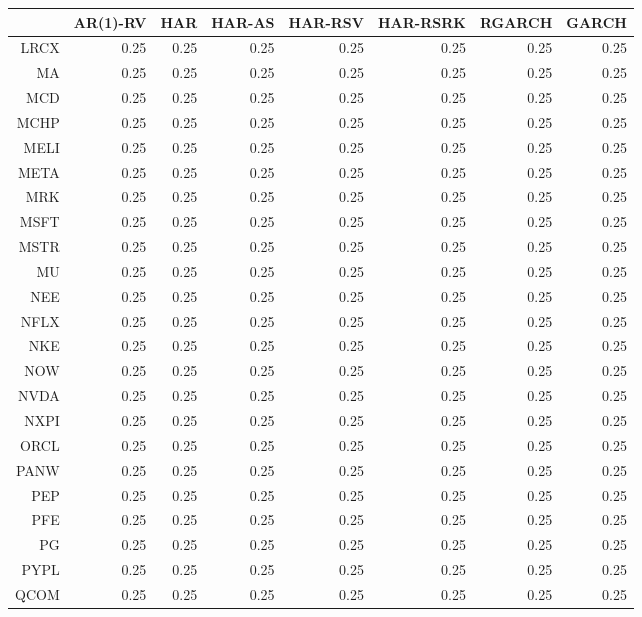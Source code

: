 \begin{table}[ht]
\centering
\begin{tabular}{rrrrrrrr}
  \hline
 & AR(1)-RV & HAR & HAR-AS & HAR-RSV & HAR-RSRK & RGARCH & GARCH \\ 
  \hline
LRCX & 0.25 & 0.25 & 0.25 & 0.25 & 0.25 & 0.25 & 0.25 \\ 
  MA & 0.25 & 0.25 & 0.25 & 0.25 & 0.25 & 0.25 & 0.25 \\ 
  MCD & 0.25 & 0.25 & 0.25 & 0.25 & 0.25 & 0.25 & 0.25 \\ 
  MCHP & 0.25 & 0.25 & 0.25 & 0.25 & 0.25 & 0.25 & 0.25 \\ 
  MELI & 0.25 & 0.25 & 0.25 & 0.25 & 0.25 & 0.25 & 0.25 \\ 
  META & 0.25 & 0.25 & 0.25 & 0.25 & 0.25 & 0.25 & 0.25 \\ 
  MRK & 0.25 & 0.25 & 0.25 & 0.25 & 0.25 & 0.25 & 0.25 \\ 
  MSFT & 0.25 & 0.25 & 0.25 & 0.25 & 0.25 & 0.25 & 0.25 \\ 
  MSTR & 0.25 & 0.25 & 0.25 & 0.25 & 0.25 & 0.25 & 0.25 \\ 
  MU & 0.25 & 0.25 & 0.25 & 0.25 & 0.25 & 0.25 & 0.25 \\ 
  NEE & 0.25 & 0.25 & 0.25 & 0.25 & 0.25 & 0.25 & 0.25 \\ 
  NFLX & 0.25 & 0.25 & 0.25 & 0.25 & 0.25 & 0.25 & 0.25 \\ 
  NKE & 0.25 & 0.25 & 0.25 & 0.25 & 0.25 & 0.25 & 0.25 \\ 
  NOW & 0.25 & 0.25 & 0.25 & 0.25 & 0.25 & 0.25 & 0.25 \\ 
  NVDA & 0.25 & 0.25 & 0.25 & 0.25 & 0.25 & 0.25 & 0.25 \\ 
  NXPI & 0.25 & 0.25 & 0.25 & 0.25 & 0.25 & 0.25 & 0.25 \\ 
  ORCL & 0.25 & 0.25 & 0.25 & 0.25 & 0.25 & 0.25 & 0.25 \\ 
  PANW & 0.25 & 0.25 & 0.25 & 0.25 & 0.25 & 0.25 & 0.25 \\ 
  PEP & 0.25 & 0.25 & 0.25 & 0.25 & 0.25 & 0.25 & 0.25 \\ 
  PFE & 0.25 & 0.25 & 0.25 & 0.25 & 0.25 & 0.25 & 0.25 \\ 
  PG & 0.25 & 0.25 & 0.25 & 0.25 & 0.25 & 0.25 & 0.25 \\ 
  PYPL & 0.25 & 0.25 & 0.25 & 0.25 & 0.25 & 0.25 & 0.25 \\ 
  QCOM & 0.25 & 0.25 & 0.25 & 0.25 & 0.25 & 0.25 & 0.25 \\ 

\end{tabular}
\end{table}
